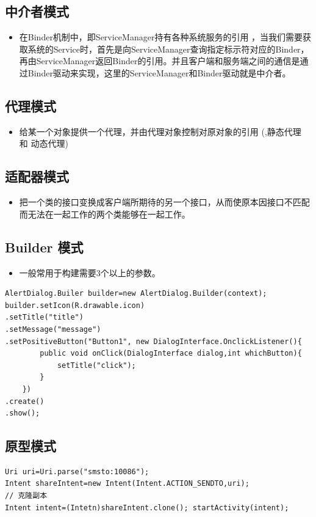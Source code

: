 \documentclass[9pt, b5paper]{article}
\begin{document}
\subsection{中介者模式}
\label{sec-15-9}
\begin{itemize}
\item 在Binder机制中，即ServiceManager持有各种系统服务的引用 ，当我们需要获取系统的Service时，首先是向ServiceManager查询指定标示符对应的Binder，再由ServiceManager返回Binder的引用。并且客户端和服务端之间的通信是通过Binder驱动来实现，这里的ServiceManager和Binder驱动就是中介者。
\end{itemize}
\subsection{代理模式}
\label{sec-15-10}
\begin{itemize}
\item 给某一个对象提供一个代理，并由代理对象控制对原对象的引用 (,静态代理 和 动态代理)
\end{itemize}
\subsection{适配器模式}
\label{sec-15-11}
\begin{itemize}
\item 把一个类的接口变换成客户端所期待的另一个接口，从而使原本因接口不匹配而无法在一起工作的两个类能够在一起工作。
\end{itemize}
\subsection{Builder 模式}
\label{sec-15-12}
\begin{itemize}
\item 一般常用于构建需要3个以上的参数。
\end{itemize}
\begin{verbatim}
AlertDialog.Builer builder=new AlertDialog.Builder(context); 
builder.setIcon(R.drawable.icon) 
.setTitle("title") 
.setMessage("message") 
.setPositiveButton("Button1", new DialogInterface.OnclickListener(){ 
        public void onClick(DialogInterface dialog,int whichButton){ 
            setTitle("click"); 
        } 
    }) 
.create() 
.show();
\end{verbatim}
\subsection{原型模式}
\label{sec-15-13}
\begin{verbatim}
Uri uri=Uri.parse("smsto:10086"); 
Intent shareIntent=new Intent(Intent.ACTION_SENDTO,uri); 
// 克隆副本 
Intent intent=(Intetn)shareIntent.clone(); startActivity(intent);
\end{verbatim}
\end{document}
